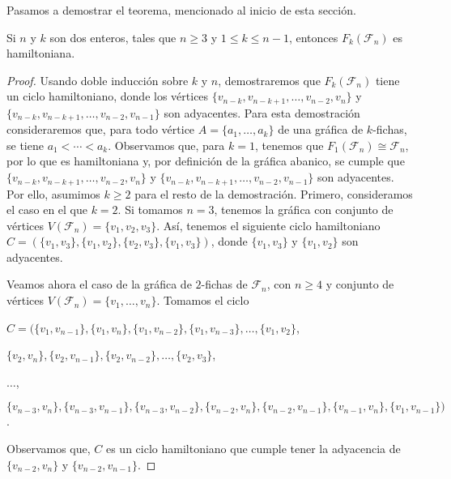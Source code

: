 Pasamos a demostrar el teorema, mencionado al inicio de esta secci\'on.
    
\begin{teorema}
\label{teo:hamilt-SFan}
    Si $n$ y $k$ son dos enteros, tales que $n \geq 3$ y $1 \leq k \leq n-1$,
    entonces $F_k(\mathcal{F}_n)$ es hamiltoniana.
\end{teorema}
    
\begin{proof}
    Usando doble inducci\'on sobre $k$ y $n$, demostraremos que
    $F_k(\mathcal{F}_n)$ tiene un ciclo hamiltoniano, donde los v\'ertices
    $\{v_{n-k}, v_{n-k+1}, \dots, v_{n-2}, v_n\}$ y $\{v_{n-k}, v_{n-k+1},
    \dots, v_{n-2}, v_{n-1}\}$ son adyacentes. Para esta demostraci\'on
    consideraremos que, para todo v\'ertice $A = \{a_1, \dots, a_k\}$ de una
    gr\'afica de $k$-fichas, se tiene $a_1 < \cdots < a_k$. Observamos que, para
    $k =1$, tenemos que $F_1(\mathcal{F}_n) \cong \mathcal{F}_n$, por lo que es
    hamiltoniana y, por definici\'on de la gr\'afica abanico, se cumple que
    $\{v_{n-k}, v_{n-k+1}, \dots, v_{n-2}, v_n\}$ y $\{v_{n-k}, v_{n-k+1},
    \dots, v_{n-2}, v_{n-1}\}$ son adyacentes. Por ello, asumimos $k \geq 2$
    para el resto de la demostraci\'on. Primero, consideramos el caso en el que
    $k =2$. Si tomamos $n = 3$, tenemos la gr\'afica con conjunto de v\'ertices
    $V(\mathcal{F}_n)=\{v_1, v_2, v_3\}$. As\'i, tenemos el siguiente ciclo
    hamiltoniano $C= (\{v_1,v_3\},\{v_1,v_2\},\{v_2,v_3\}, \{v_1,v_3\})$, donde
    $\{v_1, v_3\}$ y $\{v_1, v_2\}$ son adyacentes. 
            
    Veamos ahora el caso de la gr\'afica de $2$-fichas de $\mathcal{F}_n$, con
    $n \geq 4$ y conjunto de v\'ertices $V(\mathcal{F}_n)=\{v_1,\dots, v_n\}$.
    Tomamos el ciclo
    
    \noindent
    $C = (\{v_1, v_{n-1}\},\{v_1, v_n\},\{v_1, v_{n-2}\}, \{v_1, v_{n-3}\},
    \dots, \{v_1, v_2\}$,
    
    \noindent
    $\{v_2, v_n\}, \{v_2, v_{n-1}\}, \{v_2, v_{n-2}\}, \dots, \{v_2,v_3\}$,
    
    \noindent
    $ \dots$,
    
    \noindent
    $\{v_{n-3},v_n\}, \{v_{n-3}, v_{n-1}\},\{v_{n-3},v_{n-2}\}, \{v_{n-2},
    v_n\},\{v_{n-2}, v_{n-1}\}, \{v_{n-1}, v_n\}, \{v_1, v_{n-1}\})$.
    
    Observamos que, $C$ es un ciclo hamiltoniano que cumple tener la adyacencia
    de  $\{v_{n-2}, v_n\}$ y $\{v_{n-2}, v_{n-1}\}$. 
    

\end{proof}
